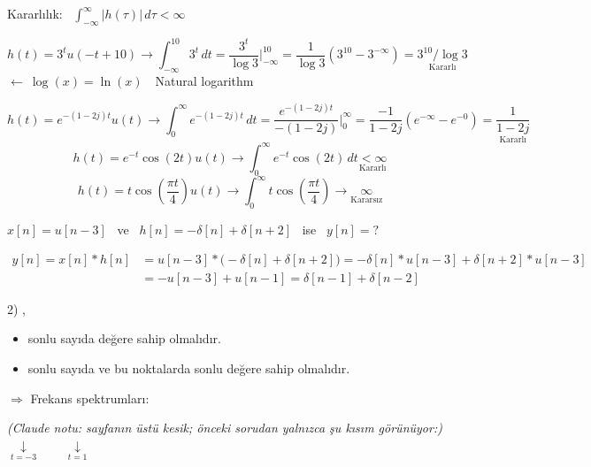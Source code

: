\documentclass[11pt,a4paper]{article}
\begin{document}

\begin{ornek}[8)]
Kararlılık: \ $\displaystyle\int_{-\infty}^{\infty} |h(\tau)|\,d\tau < \infty$
\end{ornek}
\[
h(t) = 3^t u(-t+10) \longrightarrow \int_{-\infty}^{10} 3^t\,dt = \frac{3^t}{\log 3}\Big|_{-\infty}^{10}
 = \frac{1}{\log 3}\left(3^{10} - 3^{-\infty}\right) = \underset{\text{Kararlı}}{3^{10}/\log 3}
\]
\vspace{-2mm}\hfill$\longleftarrow\ \log(x) = \ln(x)$\ \ {\small Natural logarithm}

\[
h(t) = e^{-(1-2j)t}u(t) \longrightarrow \int_0^{\infty} e^{-(1-2j)t}\,dt = \frac{e^{-(1-2j)t}}{-(1-2j)}\Big|_0^{\infty}
 = \frac{-1}{1-2j}\left(e^{-\infty} - e^{-0}\right) = \underset{\text{Kararlı}}{\frac{1}{1-2j}}
\]
\[
h(t) = e^{-t}\cos(2t)u(t) \longrightarrow \int_0^{\infty} e^{-t}\cos(2t)\,dt \underset{\text{Kararlı}}{< \infty}
\]
\[
h(t) = t\cos\left(\frac{\pi t}{4}\right)u(t) \longrightarrow \int_0^{\infty} t\cos\left(\frac{\pi t}{4}\right) \longrightarrow \underset{\text{Kararsız}}{\infty}
\]

\begin{ornek}[9)]
$x[n] = u[n-3]$ \ ve \ $h[n] = -\delta[n] + \delta[n+2]$ \ ise \ $y[n] = ?$
\end{ornek}
\[
\begin{aligned}
y[n] = x[n] * h[n] &= u[n-3] * \bigl(-\delta[n] + \delta[n+2]\bigr) = -\delta[n] * u[n-3] + \delta[n+2] * u[n-3]\\
&= -u[n-3] + u[n-1] = \delta[n-1] + \delta[n-2]
\end{aligned}
\]

2) ,
\begin{itemize}[label=--]
  \item sonlu sayıda  değere sahip olmalıdır.
  \item sonlu sayıda  ve bu noktalarda sonlu değere sahip olmalıdır.
\end{itemize}
$\Rightarrow$ Frekans spektrumları:

{\small\itshape (Claude notu: sayfanın üstü kesik; önceki sorudan yalnızca şu kısım görünüyor:)} \quad
$\underset{t=-3}{\downarrow} \qquad \underset{t=1}{\downarrow}$
\newcommand{\kok}[7]{%
\begin{tikzpicture}[x=0.42cm,y=0.75cm,baseline={(0,0.3)}]
  \draw[-{Stealth},murekkep] (#1,0) -- (#2,0) node[right,font=\small] {$n$};
  \foreach \n/\h in {#3} {\draw[murekkep,thick] (\n,0) -- (\n,\h); \fill[murekkep] (\n,\h) circle (1.5pt);}
  \foreach \n in {#4} {\fill[murekkep] (\n,0) circle (1.5pt);}
  \foreach \n in {#5} {\node[below,font=\scriptsize,inner sep=1.5pt] at (\n,0) {$\n$};}
  #6
  \node[font=\small] at ({(#1+#2)/2},-0.85) {#7};
\end{tikzpicture}}
\end{document}
